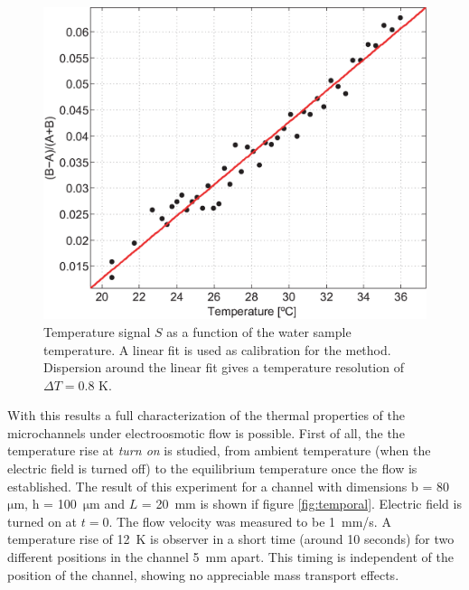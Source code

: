 \documentclass[twocolumn]{svjour3}       %
\begin{document}
\begin{figure}[h!]
\centering
\includegraphics[width=\columnwidth]{figs/fig3.eps}
\caption{Temperature signal $S$ as a function of the water sample temperature. A linear fit is used as calibration for the method. Dispersion around the linear fit gives a temperature resolution of $\Delta T = 0.8$ K.\label{fig:calib}}
\end{figure}

With this results a full characterization of the thermal properties of the microchannels under electroosmotic flow is possible. First of all, the the temperature rise at \textit{turn on} is studied, from ambient temperature (when the electric field is turned off) to the equilibrium temperature once the flow is established. The result of this experiment for a channel with dimensions b = 80~$\mathrm{\mu m}$, h = 100~$\mathrm{\mu m}$ and $L$ = 20~mm is shown if figure \ref{fig:temporal}. Electric field is turned on at $t = 0$. The flow velocity was measured to be 1~mm/s. A temperature rise of 12~K is observer in a short time (around 10 seconds) for two different positions in the channel 5~mm apart. This timing is independent of the position of the channel, showing no appreciable mass transport effects.
\end{document}

